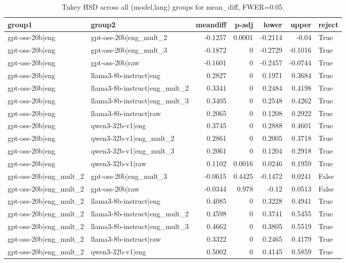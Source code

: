 \begin{table}
\caption{Tukey HSD across all (model,lang) groups for mean_diff, FWER=0.05.}
\label{tab:tukey_all_models_all_langs_mean_diff}
\begin{tabular}{l l r r r r l}
\toprule
group1 & group2 & meandiff & p-adj & lower & upper & reject \\
\midrule
gpt-oss-20b|eng & gpt-oss-20b|eng_mult_2 & -0.1257 & 0.0001 & -0.2114 & -0.04 & True \\
gpt-oss-20b|eng & gpt-oss-20b|eng_mult_3 & -0.1872 & 0 & -0.2729 & -0.1016 & True \\
gpt-oss-20b|eng & gpt-oss-20b|raw & -0.1601 & 0 & -0.2457 & -0.0744 & True \\
gpt-oss-20b|eng & llama3-8b-instruct|eng & 0.2827 & 0 & 0.1971 & 0.3684 & True \\
gpt-oss-20b|eng & llama3-8b-instruct|eng_mult_2 & 0.3341 & 0 & 0.2484 & 0.4198 & True \\
gpt-oss-20b|eng & llama3-8b-instruct|eng_mult_3 & 0.3405 & 0 & 0.2548 & 0.4262 & True \\
gpt-oss-20b|eng & llama3-8b-instruct|raw & 0.2065 & 0 & 0.1208 & 0.2922 & True \\
gpt-oss-20b|eng & qwen3-32b-v1|eng & 0.3745 & 0 & 0.2888 & 0.4601 & True \\
gpt-oss-20b|eng & qwen3-32b-v1|eng_mult_2 & 0.2861 & 0 & 0.2005 & 0.3718 & True \\
gpt-oss-20b|eng & qwen3-32b-v1|eng_mult_3 & 0.2061 & 0 & 0.1204 & 0.2918 & True \\
gpt-oss-20b|eng & qwen3-32b-v1|raw & 0.1102 & 0.0016 & 0.0246 & 0.1959 & True \\
gpt-oss-20b|eng_mult_2 & gpt-oss-20b|eng_mult_3 & -0.0615 & 0.4425 & -0.1472 & 0.0241 & False \\
gpt-oss-20b|eng_mult_2 & gpt-oss-20b|raw & -0.0344 & 0.978 & -0.12 & 0.0513 & False \\
gpt-oss-20b|eng_mult_2 & llama3-8b-instruct|eng & 0.4085 & 0 & 0.3228 & 0.4941 & True \\
gpt-oss-20b|eng_mult_2 & llama3-8b-instruct|eng_mult_2 & 0.4598 & 0 & 0.3741 & 0.5455 & True \\
gpt-oss-20b|eng_mult_2 & llama3-8b-instruct|eng_mult_3 & 0.4662 & 0 & 0.3805 & 0.5519 & True \\
gpt-oss-20b|eng_mult_2 & llama3-8b-instruct|raw & 0.3322 & 0 & 0.2465 & 0.4179 & True \\
gpt-oss-20b|eng_mult_2 & qwen3-32b-v1|eng & 0.5002 & 0 & 0.4145 & 0.5859 & True \\

\end{tabular}
\end{table}
